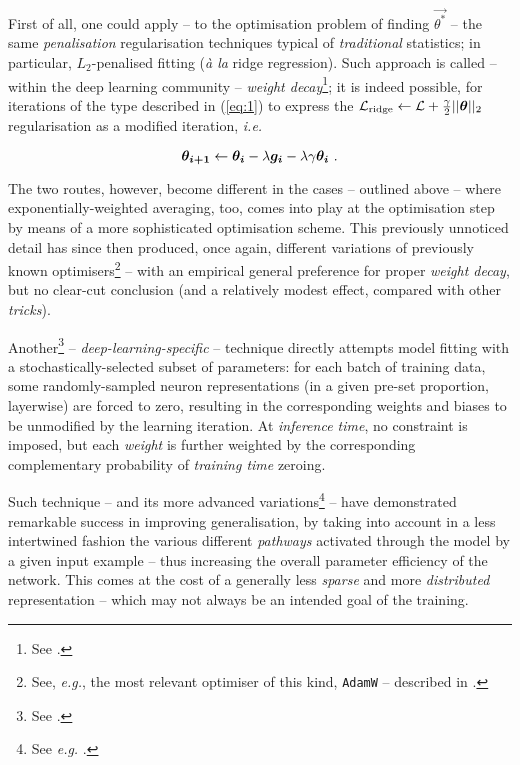First of all, one could apply -- to the optimisation problem of finding $\vec{\theta^*}$ -- the same \textit{penalisation} regularisation techniques typical of \textit{traditional} statistics; in particular, $L_2$-penalised fitting (\textit{à la} ridge regression). Such approach is called -- within the deep learning community -- \textit{weight decay}\footnote{See \cite{KroghPalmer1991WeightDecay}.}; it is indeed possible, for iterations of the type described in (\ref{eq:1}) to express the $\mathcal{L}_{\text{ridge}} \leftarrow \mathcal{L} + \frac{\gamma}{2}||\bm{\theta}||_2$ regularisation as a modified iteration, \textit{i.e.}

$$\bm{\theta_{i+1}} \leftarrow  \bm{\theta_{i}} - \lambda\bm{g_i} - \lambda\gamma\bm{\theta_i}\text{ .}$$

The two routes, however, become different in the cases -- outlined above -- where exponentially-weighted averaging, too, comes into play at the optimisation step by means of a more sophisticated optimisation scheme. This previously unnoticed detail has since then produced, once again, different variations of previously known optimisers\footnote{See, \textit{e.g.}, the most relevant optimiser of this kind, \texttt{AdamW} -- described in \cite{LoshchilovHutter2018AdamW}.} -- with an empirical general preference for proper \textit{weight decay}, but no clear-cut conclusion (and a relatively modest effect, compared with other \textit{tricks}).

Another\footnote{See \cite{SirvastavaEtAl2014Dropout}.} -- \textit{deep-learning-specific} -- technique directly attempts model fitting with a stochastically-selected subset of parameters: for each batch of training data, some randomly-sampled neuron representations (in a given pre-set proportion, layerwise) are forced to zero, resulting in the corresponding weights and biases to be unmodified by the learning iteration. At \textit{inference time}, no constraint is imposed, but each \textit{weight} is further weighted by the corresponding complementary probability of \textit{training time} zeroing.

Such technique -- and its more advanced variations\footnote{See \textit{e.g.} \cite{BolukiEtAl2020BernoulliDropout}.} -- have demonstrated remarkable success in improving generalisation, by taking into account in a less intertwined fashion the various different \textit{pathways} activated through the model by a given input example -- thus increasing the overall parameter efficiency of the network. This comes at the cost of a generally less \textit{sparse} and more \textit{distributed} representation -- which may not always be an intended goal of the training.

